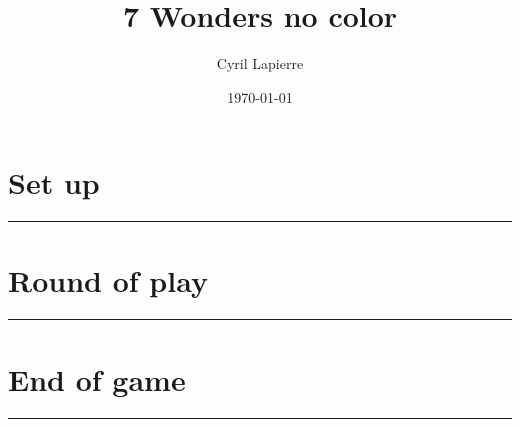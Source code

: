 \documentclass{scrartcl}%
\title{7 Wonders no color}%
\author{Cyril Lapierre}%
\date{\today}%
\begin{document}
%
\normalsize%
\maketitle\thispagestyle{header}%
\pagestyle{header}%
\section{ Set up
}%
\label{sec:Setup}%
\rule{18cm}{0.07cm}\break

%
\section{ Round of play
}%
\label{sec:Roundofplay}%
\rule{18cm}{0.07cm}\break

%
\section{ End of game}%
\label{sec:Endofgame}%
\rule{18cm}{0.07cm}\break

%
\end{document}

